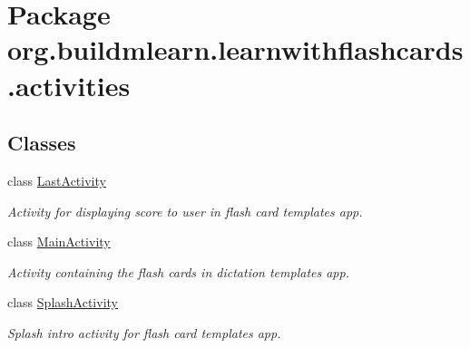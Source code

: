 \hypertarget{namespaceorg_1_1buildmlearn_1_1learnwithflashcards_1_1activities}{}\section{Package org.\+buildmlearn.\+learnwithflashcards.\+activities}
\label{namespaceorg_1_1buildmlearn_1_1learnwithflashcards_1_1activities}
\subsection*{Classes}
\begin{DoxyCompactItemize}
\item 
class \hyperlink{classorg_1_1buildmlearn_1_1learnwithflashcards_1_1activities_1_1LastActivity}{Last\+Activity}
\begin{DoxyCompactList}\small\item\em Activity for displaying score to user in flash card template\textquotesingle{}s app. \end{DoxyCompactList}\item 
class \hyperlink{classorg_1_1buildmlearn_1_1learnwithflashcards_1_1activities_1_1MainActivity}{Main\+Activity}
\begin{DoxyCompactList}\small\item\em Activity containing the flash cards in dictation template\textquotesingle{}s app. \end{DoxyCompactList}\item 
class \hyperlink{classorg_1_1buildmlearn_1_1learnwithflashcards_1_1activities_1_1SplashActivity}{Splash\+Activity}
\begin{DoxyCompactList}\small\item\em Splash intro activity for flash card template\textquotesingle{}s app. \end{DoxyCompactList}\end{DoxyCompactItemize}
